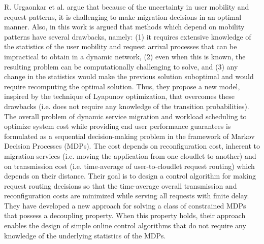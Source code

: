 \noindent\tab R. Urgaonkar et al. \cite{urgaonkar2015dynamic} argue that because of the uncertainty in user mobility and request patterns, it is challenging to make migration decisions in an optimal manner. Also, in this work is argued that methods which depend on mobility patterns have several drawbacks, namely: (1) it requires extensive knowledge of the statistics of the user mobility and request arrival processes that can be impractical to obtain in a dynamic network, (2) even when this is known, the resulting problem can be computationally challenging to solve, and (3) any change in the statistics would make the previous solution suboptimal and would require recomputing the optimal solution. Thus, they propose a new model, inspired by the technique of Lyapunov optimization, that overcomes these drawbacks (i.e. does not require any knowledge of the transition probabilities). The overall problem of dynamic service migration and workload scheduling to optimize system cost while providing end user performance guarantees is formulated as a sequential decision-making problem in the framework of Markov Decision Processes (MDPs). The cost depends on reconfiguration cost, inherent to migration services (i.e. moving the application from one cloudlet to another) and on transmission cost (i.e. time-average of user-to-cloudlet request routing) which depends on their distance. Their goal is to design a control algorithm for making request routing decisions so that the time-average overall transmission and reconfiguration costs are minimized while serving all requests with finite delay. They have developed a new approach for solving a class of constrained MDPs that possess a decoupling property. When this property holds, their approach enables the design of simple online control algorithms that do not require any knowledge of the underlying statistics of the MDPs.

